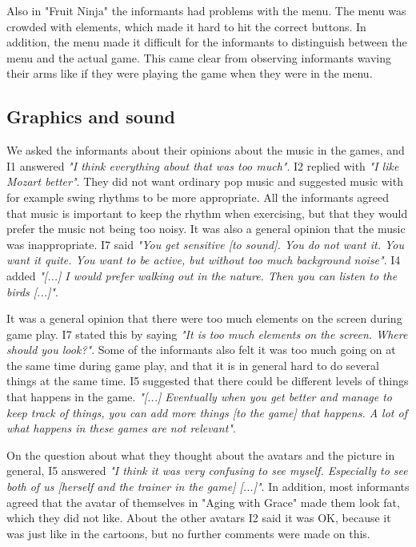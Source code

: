 Also in "Fruit Ninja" the informants had problems with the menu. The menu was crowded with elements, which made it hard to hit the correct buttons. In addition, the menu made it difficult for the informants to distinguish between the menu and the actual game. This came clear from observing informants waving their arms like if they were playing the game when they were in the menu. 

\subsection{Graphics and sound}

We asked the informants about their opinions about the music in the games, and I1 answered \emph{"I think everything about that was too much"}. I2 replied with \emph{"I like Mozart better"}. They did not want ordinary pop music and suggested music with for example swing rhythms to be more appropriate. All the informants agreed that music is important to keep the rhythm when exercising, but that they would prefer the music not being too noisy. It was also a general opinion that the music was inappropriate.  I7 said \emph{"You get sensitive [to sound]. You do not want it. You want it quite. You want to be active, but without too much background noise"}. I4 added \emph{"[...] I would prefer walking out in the nature. Then you can listen to the birds [...]"}.

It was a general opinion that there were too much elements on the screen during game play. I7 stated this by saying \emph{"It is too much elements on the screen. Where should you look?"}. Some of the informants also felt it was too much going on at the same time during game play, and that it is in general hard to do several things at the same time. I5 suggested that there could be different levels of things that happens in the game.  \emph{"[...] Eventually when you get better and manage to keep track of things, you can add more things [to the game] that happens. A lot of what happens in these games are not relevant"}. 

On the question about what they thought about the avatars and the picture in general, I5 answered \emph{"I think it was very confusing to see myself. Especially to see both of us [herself and the trainer in the game] [...]"}. In addition, most informants agreed that the avatar of themselves in "Aging with Grace" made them look fat, which they did not like. About the other avatars I2 said it was OK, because it was just like in the cartoons, but no further comments were made on this.  

